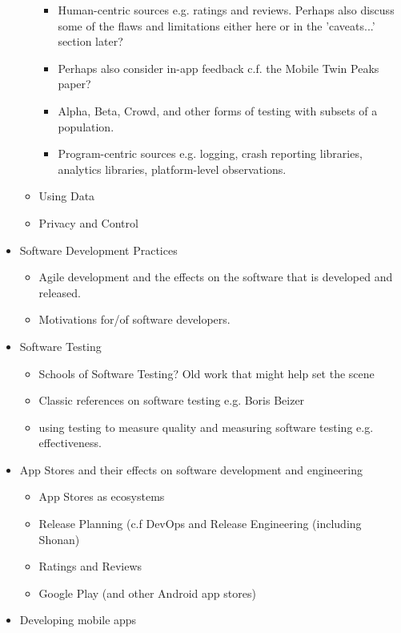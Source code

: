 \begin{itemize}
\begin{itemize}
        \begin{itemize}
            \item Human-centric sources e.g. ratings and reviews. Perhaps also discuss some of the flaws and limitations either here or in the 'caveats...' section later?
            \item Perhaps also consider in-app feedback c.f. the Mobile Twin Peaks paper?
            \item Alpha, Beta, Crowd, and other forms of testing with subsets of a population.
            \item Program-centric sources e.g. logging, crash reporting libraries, analytics libraries, platform-level observations.
        \end{itemize}
        \item Using Data
        \item Privacy and Control
    \end{itemize}
    \item Software Development Practices
    \begin{itemize}
        \item Agile development and the effects on the software that is developed and released.
        \item Motivations for/of software developers.
    \end{itemize}
    \item Software Testing
    \begin{itemize}
        \item Schools of Software Testing? Old work that might help set the scene
        \item Classic references on software testing e.g. Boris Beizer
        \item using testing to measure quality and measuring software testing e.g. effectiveness.
    \end{itemize}
    \item App Stores and their effects on software development and engineering
    \begin{itemize}
        \item App Stores as ecosystems
        \item Release Planning (c.f DevOps and Release Engineering (including Shonan)
        \item Ratings and Reviews
        \item Google Play (and other Android app stores)
    \end{itemize}
    \item Developing mobile apps

\end{itemize}
